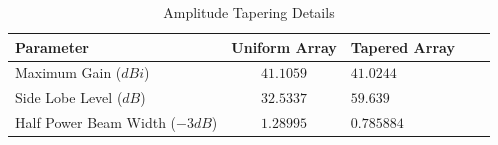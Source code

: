 \documentclass[11pt]{witseiepaper}
\begin{document}
\begin{bibunit}[witseie]
\begin{table}[htb]
    \caption{Amplitude Tapering Details}
    \label{tab:AmplitudeTapering}
    \begin{center}
        \begin{tabular}{p{60mm}cp{40mm}cp{40mm}}
            \hline 
            Parameter & Uniform Array & Tapered Array \\
            \hline
            Maximum Gain ($dBi$) & $41.1059$ & $41.0244$ \\
            Side Lobe Level ($dB$) & $32.5337$ & $59.639$ \\
            Half Power Beam Width ($-3 dB$) & $1.28995$ & $0.785884$ \\
            \hline
        \end{tabular}
    \end{center}
\end{table}













\end{bibunit}
\end{document}

